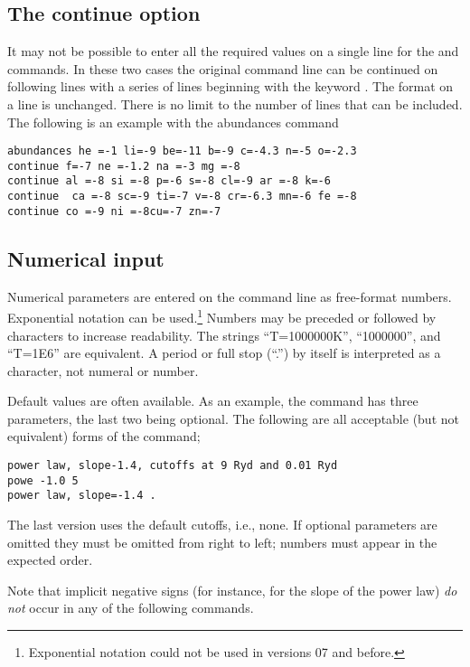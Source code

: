 \subsection{The continue option}

It may not be possible to enter all the required values on a single line
for the  and  commands.  In these two cases the original
command line can be continued on following lines with a series of lines
beginning with the keyword .  The format on a  line is
unchanged.  There is no limit to the number of  lines that can be
included.   The following
is an example with the abundances command
\begin{verbatim}
abundances he =-1 li=-9 be=-11 b=-9 c=-4.3 n=-5 o=-2.3
continue f=-7 ne =-1.2 na =-3 mg =-8
continue al =-8 si =-8 p=-6 s=-8 cl=-9 ar =-8 k=-6
continue  ca =-8 sc=-9 ti=-7 v=-8 cr=-6.3 mn=-6 fe =-8
continue co =-9 ni =-8cu=-7 zn=-7
\end{verbatim}

\subsection{Numerical input}

Numerical parameters are entered on the command line as free-format
numbers.
Exponential notation can be used.\footnote{Exponential notation could not be used in versions 07 and before.}
Numbers may be preceded
or followed by characters to increase readability.
The strings
``T=1000000K'', ``1000000'', and ``T=1E6'' are equivalent.
A period or full stop (``.'') by itself is interpreted as a character,
not numeral or number.

Default values are often available.
As an example, the  command
has three parameters, the last two being optional.  The following are all
acceptable (but not equivalent) forms of the command;
\begin{verbatim}
power law, slope-1.4, cutoffs at 9 Ryd and 0.01 Ryd
powe -1.0 5
power law, slope=-1.4 .
\end{verbatim}
The last version uses the default cutoffs, i.e., none.  If optional
parameters are omitted they must be omitted from right to left; numbers
must appear in the expected order.

Note that implicit negative signs (for instance, for the slope of the
power law) \emph{do not} occur in any of the following commands.

